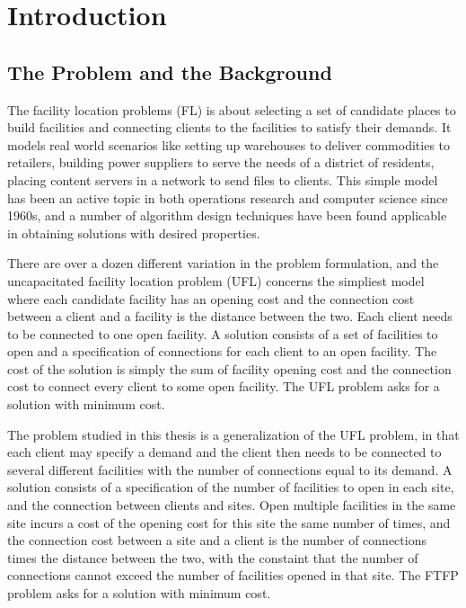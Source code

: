 \documentclass[oneside,final]{ucr}
\begin{document}
\chapter{Introduction} \label{ch: intro}

\section{The Problem and the Background}
The facility location problems (FL) is about selecting a set of
candidate places to build facilities and connecting clients to the
facilities to satisfy their demands. It models real world scenarios
like setting up warehouses to deliver commodities to retailers,
building power suppliers to serve the needs of a district of
residents, placing content servers in a network to send files to
clients. This simple model has been an active topic in both operations
research and computer science since 1960s, and a number of algorithm
design techniques have been found applicable in obtaining solutions
with desired properties.

There are over a dozen different variation in the problem formulation,
and the uncapacitated facility location problem (UFL) concerns the
simpliest model where each candidate facility has an opening cost and
the connection cost between a client and a facility is the distance
between the two. Each client needs to be connected to one open
facility. A solution consists of a set of facilities to open and a
specification of connections for each client to an open facility. The
cost of the solution is simply the sum of facility opening cost and
the connection cost to connect every client to some open facility. The
UFL problem asks for a solution with minimum cost.

The problem studied in this thesis is a generalization of the UFL
problem, in that each client may specify a demand and the client then
needs to be connected to several different facilities with the number
of connections equal to its demand.  A solution consists of a
specification of the number of facilities to open in each site, and
the connection between clients and sites. Open multiple facilities in
the same site incurs a cost of the opening cost for this site the same
number of times, and the connection cost between a site and a client
is the number of connections times the distance between the two, with
the constaint that the number of connections cannot exceed the number
of facilities opened in that site. The FTFP problem asks for a
solution with minimum cost.
\end{document}

